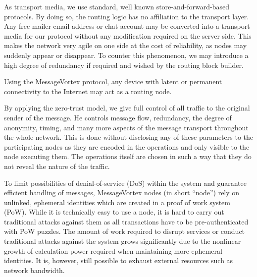 \documentclass[runningheads]{llncs}
\begin{document}
As transport media, we use standard, well known store-and-forward-based protocols. By doing so, the routing logic has no affiliation to the transport layer. Any free-mailer email address or chat account may be converted into a transport media for our protocol without any modification required on the server side. This makes the network very agile on one side at the cost of reliability, as nodes may suddenly appear or disappear. To counter this phenomenon, we may introduce a high degree of redundancy if required and wished by the routing block builder.

Using the MessageVortex protocol, any device with latent or permanent connectivity to the Internet may act as a routing node. 

By applying the zero-trust model, we give full control of all traffic to the original sender of the message. He controls message flow, redundancy, the degree of anonymity, timing, and many more aspects of the message transport throughout the whole network. This is done without disclosing any of these parameters to the participating nodes as they are encoded in the operations and only visible to the node executing them. The operations itself are chosen in such a way that they do not reveal the nature of the traffic.

To limit possibilities of denial-of-service (DoS) within the system and guarantee efficient handling of messages, MessageVortex nodes (in short ``node'') rely on unlinked, ephemeral identities which are created in a proof of work system (PoW). While it is technically easy to use a node, it is hard to carry out traditional attacks against them as all transactions have to be pre-authenticated with PoW puzzles. The amount of work required to disrupt services or conduct traditional attacks against the system grows significantly due to the nonlinear growth of calculation power required when maintaining more ephemeral identities. It is, however, still possible to exhaust external resources such as network bandwidth.\par\nopagebreak
\end{document}
